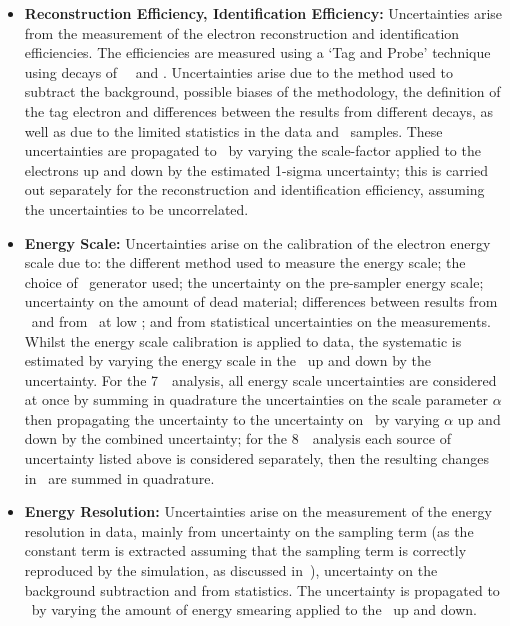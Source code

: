\begin{itemize}
     \item {\bf Reconstruction Efficiency, Identification Efficiency:}
     Uncertainties arise from the measurement of the electron reconstruction and
     identification efficiencies. The efficiencies are measured using a `Tag and
     Probe' technique using decays of \W\, \Z\ and \JPsi. Uncertainties arise
     due to the method used to subtract the background, possible biases of the
     methodology, the definition of the
     tag electron and differences between the results from different decays, as
     well as due to the limited statistics in the data and \mc\ samples. These
     uncertainties are propagated to \CZZ\ by varying the scale-factor applied
     to the electrons up and down by the estimated 1-sigma uncertainty; this is carried out
     separately for the reconstruction and identification efficiency, assuming
     the uncertainties to be uncorrelated.

    \item {\bf Energy Scale:}
    Uncertainties arise on the calibration of the electron energy scale due to: 
    the different method used to measure the energy scale; the
    choice of \mc\ generator used; the uncertainty on the pre-sampler energy 
    scale; uncertainty on the amount of dead material; differences between
    results from \Zee\ and from \JPsiee\ at low \et; and from statistical
    uncertainties on the measurements. Whilst the energy scale calibration is
    applied to data, the systematic is estimated by varying the energy scale in
    the \mc\ up and down by the uncertainty. For the 7~\tev\ analysis, all
    energy scale
    uncertainties are considered at once by summing in quadrature the
    uncertainties on the scale parameter $\alpha$ then propagating the
    uncertainty to the uncertainty on \CZZ\ by varying $\alpha$ up and down by
    the combined uncertainty; for the 8~\tev\ analysis each source of
    uncertainty listed above is considered separately, then the resulting
    changes in \CZZ\ are summed in quadrature.

    \item {\bf Energy Resolution:} Uncertainties arise on the measurement of the
    energy resolution in data, mainly from uncertainty on the sampling term (as
    the constant term is extracted assuming that the sampling term is correctly
    reproduced by the simulation, as discussed in~),
    uncertainty on the background subtraction and from statistics. The
    uncertainty is propagated to \CZZ\ by varying the amount of energy smearing
    applied to the \mc\ up and down.


\end{itemize}
